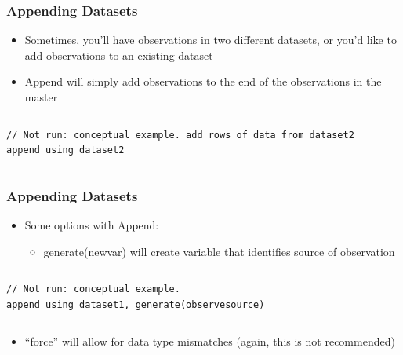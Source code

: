 \documentclass[table]{beamer}
\begin{document}
\begin{frame}[fragile]
\frametitle{Appending Datasets}
\label{sec-6-8}

\begin{itemize}
\item Sometimes, you'll have observations in two
  different datasets, or you'd like to add
  observations to an existing dataset
\item Append will simply add observations to the
  end of the observations in the master
\end{itemize}
\vspace{-.5em} \begin{columns}  \begin{block}{}

\begin{verbatim}
// Not run: conceptual example. add rows of data from dataset2 
append using dataset2
\end{verbatim}
\end{block} \end{columns}
\end{frame}
\begin{frame}[fragile]
\frametitle{Appending Datasets}
\label{sec-6-9}

\begin{itemize}
\item Some options with Append:
\begin{itemize}
\item generate(newvar) will create variable that
     identifies source of observation
\end{itemize}
\end{itemize}
\vspace{-.5em} \begin{columns}  \begin{block}{}

\begin{verbatim}
// Not run: conceptual example.
append using dataset1, generate(observesource)
\end{verbatim}
\end{block} \end{columns}
     
\begin{itemize}
\item ``force'' will allow for data type mismatches
     (again, this is not recommended)
\end{itemize}
\end{frame}
\end{document}
